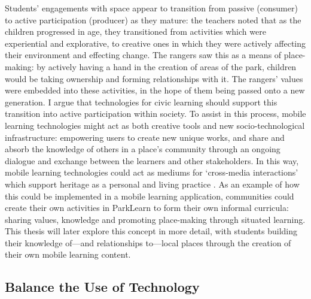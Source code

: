 Students' engagements with space appear to transition from passive (consumer) to active participation (producer) as they mature: the teachers noted that as the children progressed in age, they transitioned from activities which were experiential and explorative, to creative ones in which they were actively affecting their environment and effecting change. The rangers saw this as a means of place-making: by actively having a hand in the creation of areas of the park, children would be taking ownership and forming relationships with it. The rangers’ values were embedded into these activities, in the hope of them being passed onto a new generation. I argue that technologies for civic learning should support this transition into active participation within society. To assist in this process, mobile learning technologies might act as both creative tools and new socio-technological infrastructure: empowering users to create new unique works, and share and absorb the knowledge of others in a place’s community through an ongoing dialogue and exchange between the learners and other stakeholders. In this way, mobile learning technologies could act as mediums for `cross-media interactions' which support heritage as a personal and living practice \citep{Giaccardi2008}. As an example of how this could be implemented in a mobile learning application, communities could create their own activities in ParkLearn to form their own informal curricula: sharing values, knowledge and promoting place-making through situated learning. This thesis will later explore this concept in more detail, with students building their knowledge of---and relationships to---local places through the creation of their own mobile learning content.

\subsection{Balance the Use of Technology}
\label{sec:BalanceTechUse}

